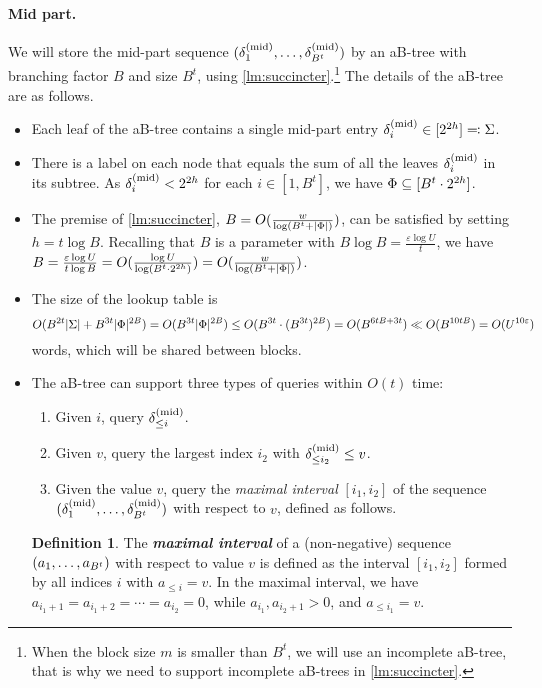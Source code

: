 \documentclass{article}
\theoremstyle{plain}
\theoremstyle{definition}  \newtheorem{definition}[theorem]{Definition}
\DeclarePairedDelimiter{\bk}{(}{)}
\DeclarePairedDelimiter{\Bk}{[}{]}
\DeclarePairedDelimiter{\abs}{\lvert}{\rvert}
\newcommand{\eqdef}{\eqqcolon}
\newcommand{\eps}{\varepsilon}
\newcommand{\deltamid}[1][i]{\delta_{#1}^{(\textup{mid})}}
\newcommand{\defn}[1]{\emph{\textbf{#1}}}
\begin{document}
\paragraph*{Mid part.}
We will store the mid-part sequence $\bk{\deltamid[1], \ldots, \deltamid[B^t]}$ by an aB-tree with branching factor $B$ and size $B^t$, using \cref{lm:succincter}.\footnote{When the block size $m$ is smaller than $B^t$, we will use an incomplete aB-tree, that is why we need to support incomplete aB-trees in \cref{lm:succincter}.}
The details of the aB-tree are as follows.
\begin{itemize}
\item Each leaf of the aB-tree contains a single mid-part entry $\deltamid[i] \in [2^{2h}] \eqdef \Sigma$.
\item There is a label on each node that equals the sum of all the leaves $\deltamid$ in its subtree. As $\deltamid < 2^{2h}$ for each $i \in [1, B^t]$, we have $\Phi \subseteq \Bk{B^t \cdot 2^{2h}}$.
\item The premise of \cref{lm:succincter}, $B = O(\frac{w}{\log \bk{B^t + \abs{\Phi}}})$, can be satisfied by setting $h = t \log B$. Recalling that $B$ is a parameter with $B\log B = \frac{\eps\log U}{t}$, we have $B = \frac{\eps\log U}{t\log B} = O\bk{\frac{\log U}{\log \bk{B^t\cdot 2^{2h}}}} = O\bk{\frac{w}{\log \bk{B^t + \abs{\Phi}}}}$.
\item The size of the lookup table is
  \[O(B^{2t}\abs{\Sigma} + B^{3t}\abs{\Phi}^{2B}) = O(B^{3t}\abs{\Phi}^{2B}) \le O(B^{3t} \cdot (B^{3t})^{2B}) = O(B^{6tB + 3t}) \ll O(B^{10tB}) = O(U^{10\eps})\]
  words, which will be shared between blocks.
\item The aB-tree can support three types of queries within $O(t)$ time:
  \begin{enumerate}
  \item Given $i$, query $\deltamid[\le i]$.
  \item Given $v$, query the largest index $i_2$ with $\deltamid[\le i_2] \le v$.
  \item Given the value $v$, query the \emph{maximal interval} $[i_1, i_2]$ of the sequence $\bk{\deltamid[1], \ldots, \deltamid[B^t]}$ with respect to $v$, defined as follows.
  \end{enumerate}
  \begin{definition}
    The \defn{maximal interval} of a (non-negative) sequence $\bk{a_1, \ldots, a_{B^t}}$ with respect to value $v$ is defined as the interval $[i_1, i_2]$ formed by all indices $i$ with $a_{\le i} = v$. In the maximal interval, we have $a_{i_1 + 1} = a_{i_1 + 2} = \cdots = a_{i_2} = 0$, while $a_{i_1}, a_{i_2 + 1} > 0$, and $a_{\le i_1} = v$.
  \end{definition}
\end{itemize}
\end{document}
